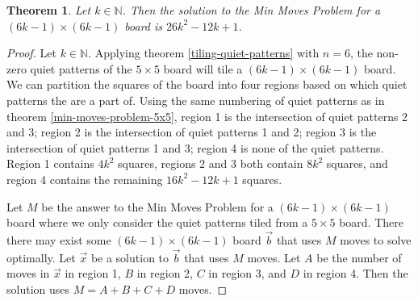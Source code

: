 \documentclass[a4paper]{article}
\newtheorem{theorem}{Theorem}
\newcommand{\N}{\mathbb{N}}
\begin{document}
	\begin{theorem}\label{min-moves-problem-6k-1x6k-1}
		Let $k \in \N$.
		Then the solution to the Min Moves Problem for a $(6k - 1) \times (6k - 1)$ board is $26k^2 - 12k + 1$.
	\end{theorem}
	\begin{proof}
		Let $k \in \N$.
		Applying theorem \ref{tiling-quiet-patterns} with $n=6$, the non-zero quiet patterns of the $5 \times 5$ board will tile a $(6k - 1) \times (6k - 1)$ board.
		We can partition the squares of the board into four regions based on which quiet patterns the are a part of.
		Using the same numbering of quiet patterns as in theorem \ref{min-moves-problem-5x5}, region 1 is the intersection of quiet patterns 2 and 3; region 2 is the intersection of quiet patterns 1 and 2; region 3 is the intersection of quiet patterns 1 and 3; region 4 is none of the quiet patterns.
		Region 1 contains $4k^2$ squares, regions 2 and 3 both contain $8k^2$ squares, and region 4 contains the remaining $16k^2 - 12k + 1$ squares.
		
		Let $M$ be the answer to the Min Moves Problem for a $(6k-1) \times (6k-1)$ board where we only consider the quiet patterns tiled from a $5 \times 5$ board.
		There there may exist some $(6k-1) \times (6k-1)$ board $\vec{b}$ that uses $M$ moves to solve optimally.
		Let $\vec{x}$ be a solution to $\vec{b}$ that uses $M$ moves.
		Let $A$ be the number of moves in $\vec{x}$ in region 1, $B$ in region 2, $C$ in region 3, and $D$ in region 4.
		Then the solution uses $M = A + B + C + D$ moves.
		

\end{proof}
\end{document}
